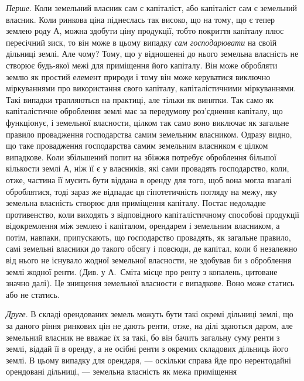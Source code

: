 \emph{Перше}. Коли земельний власник сам є капіталіст, або капіталіст сам є
земельний власник. Коли ринкова ціна піднеслась так високо, що на тому,
що є тепер землею роду $А$, можна здобути ціну продукції, тобто покриття капіталу
плюс пересічний зиск, то він може в цьому випадку \emph{сам господарювати}
на своїй дільниці землі. Але чому? Тому, що у відношенні до нього земельна
власність не створює будь-якої межі для приміщення його капіталу.
Він може обробляти землю як простий елемент природи і тому він може керуватися
виключно міркуваннями про використання свого капіталу, капіталістичними
міркуваннями. Такі випадки трапляються на практиці, але тільки як винятки.
Так само як капіталістичне оброблення землі має за передумову роз’єднення капіталу,
що функціонує, і земельної власности, цілком так само воно виключає як
загальне правило провадження господарства самим земельним власником. Одразу
видно, що таке провадження господарства самим земельним власником є цілком
випадкове. Коли збільшений попит на збіжжя потребує оброблення більшої кількости
землі $А$, ніж її є у власників, які сами провадять господарство, коли, отже,
частина її мусить бути віддана в оренду для того, щоб вона могла взагалі оброблятися,
тоді зараз же відпадає ця гіпотетичність погляду на межу, яку земельна
власність створює для приміщення капіталу. Постає недоладне противенство,
коли виходять з відповідного капіталістичному способові продукції відокремлення
між землею і капіталом, орендарем і земельним власником, а потім,
навпаки, припускають, що господарство провадять, як загальне правило, самі
земельні власники до такого обсягу і повсюди, де капітал, коли б незалежно
від нього не існувало жодної земельної власности, не здобував би з оброблення
землі жодної ренти. (Див. у А.~Сміта місце про ренту з копалень, цитоване
значно далі). Це знищення земельної власности є випадкове. Воно може статись
або не статись.

\emph{Друге}. В складі орендованих земель можуть бути такі окремі дільниці
землі, що за даного ріння ринкових цін не дають ренти, отже, на ділі здаються
даром, але земельний власник не вважає їх за такі, бо він бачить загальну суму
ренти з землі, віддай її в оренду, а не осібні ренти з окремих складових дільниць
його землі. В цьому випадку для орендаря, — оскільки справа йде про
нерентодайні орендовані дільниці, — земельна власність як межа приміщення
\parbreak{}  %
